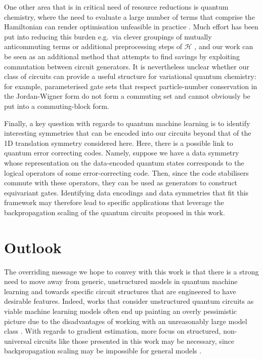\documentclass[a4paper,twocolumn,11pt]{quantumarticle}
\begin{document}
One other area that is in critical need of resource reductions is quantum chemistry, where the need to evaluate a large number of terms that comprise the Hamiltonian can render optimisation unfeasible in practice \cite{vqe_review}. Much effort has been put into reducing this burden e.g.~via clever groupings of mutually anticommuting terms \cite{Verteletskyi_Izmaylov_20,Yen_Izmaylov_20} or additional preprocessing steps of $\mathcal{H}$ \cite{Huggins_Babbush_21}, and our work can be seen as an additional method that attempts to find savings by exploiting commutation between circuit generators. It is nevertheless unclear whether our class of circuits can provide a useful structure for variational quantum chemistry: for example, parameterised gate sets that respect particle-number conservation in the Jordan-Wigner form do not form a commuting set and cannot obviously be put into a commuting-block form. 

Finally, a key question with regards to quantum machine learning is to identify interesting symmetries that can be encoded into our circuits beyond that of the 1D translation symmetry considered here. Here, there is a possible link to quantum error correcting codes. Namely, suppose we have a data symmetry whose representation on the data-encoded quantum states corresponds to the logical operators of some error-correcting code. Then, since the code stabilisers commute with these operators, they can be used as generators to construct equivariant gates. Identifying data encodings and data symmetries that fit this framework may therefore lead to specific applications that leverage the backpropagation scaling of the quantum circuits proposed in this work. 


\section{Outlook}
The overriding message we hope to convey with this work is that there is a strong need to move away from generic, unstructured models in quantum machine learning and towards specific circuit structures that are engineered to have desirable features. Indeed, works that consider unstructured quantum circuits as viable machine learning models often end up painting an overly pessimistic picture due to the disadvantages of working with an unreasonably large model class \cite{mcclean2018barren,anschuetz2022quantum,anschuetz2021critical,campos2021}. With regards to gradient estimation, more focus on structured, non-universal circuits like those presented in this work may be necessary, since backpropagation scaling may be impossible for general models \cite{abbas2023quantum}.
 
\end{document}
